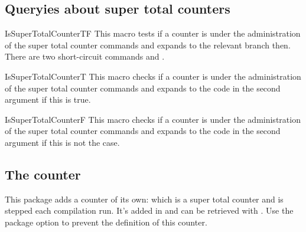 \documentclass[12pt,a4paper,oneside]{article}
\begin{document}
\subsection{Queryies about super total counters}

\begin{docCommand}{IsSuperTotalCounterTF}{}
This macro tests if a counter is under the administration of the super total counter commands and expands to the relevant branch then. There are two short-circuit commands  and .
\end{docCommand}




\begin{docCommand}{IsSuperTotalCounterT}{}
This macro checks if a counter is under the administration of the super total counter commands and expands to the code in the second argument if this is true.
\end{docCommand}


\begin{docCommand}{IsSuperTotalCounterF}{}
This macro checks if a counter is under the administration of the super total counter commands and expands to the code in the second argument if this is not the case.
\end{docCommand}


\begin{dispExample}


\end{dispExample}

\subsection{The  counter}\label{subsection:numberofruns}

This package adds a counter of its own:  which is a super total counter and is stepped each compilation run. It's added in  and can be retrieved with . Use the  package option to prevent the definition of this counter.  
\end{document}

